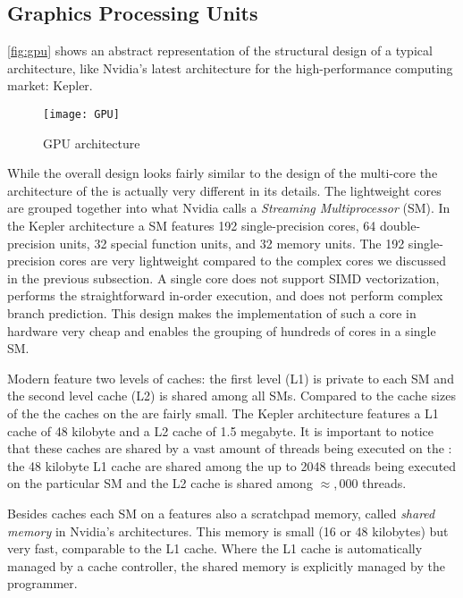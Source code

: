 \subsection{Graphics Processing Units}
\autoref{fig:gpu} shows an abstract representation of the structural design of a typical \GPU architecture, like Nvidia's latest \GPU architecture for the high-performance computing market: Kepler.
\begin{figure}
  \centering
  \texttt{[image: GPU]}
  \caption{GPU architecture}
  \label{fig:gpu}
\end{figure}
While the overall design looks fairly similar to the design of the multi-core \CPU the architecture of the \GPU is actually very different in its details.
The lightweight \GPU cores are grouped together into what Nvidia calls a \emph{Streaming Multiprocessor} (SM).
In the Kepler architecture a SM features 192 single-precision cores, 64 double-precision units, 32 special function units, and 32 memory units.
The 192 single-precision cores are very lightweight compared to the complex \CPU cores we discussed in the previous subsection.
A single \GPU core does not support SIMD vectorization, performs the straightforward in-order execution, and does not perform complex branch prediction.
This design makes the implementation of such a core in hardware very cheap and enables the grouping of hundreds of cores in a single SM.

Modern \GPUs feature two levels of caches:
the first level (L1) is private to each SM and the second level cache (L2) is shared among all SMs.
Compared to the cache sizes of the \CPU the caches on the \GPU are fairly small.
The Kepler architecture features a L1 cache of 48 kilobyte and a L2 cache of 1.5 megabyte.
It is important to notice that these caches are shared by a vast amount of threads being executed on the \GPU:
the 48 kilobyte L1 cache are shared among the up to 2048 threads being executed on the particular SM and the L2 cache is shared among $\approx{}$,\,000 threads.

Besides caches each SM on a \GPU features also a scratchpad memory, called \emph{shared memory} in Nvidia's \GPU architectures.
This memory is small (16 or 48 kilobytes) but very fast, comparable to the L1 cache.
Where the L1 cache is automatically managed by a cache controller, the shared memory is explicitly managed by the programmer.

